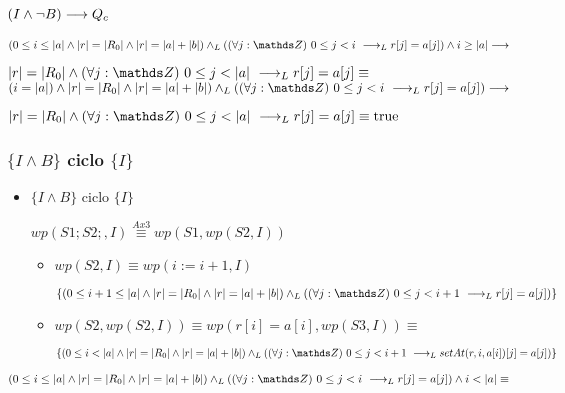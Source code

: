 \documentclass{article}
\begin{document}
\subsubsection*{$(I \wedge \neg B) \longrightarrow Q_{c}$}
$(0 \leq i \leq \longitud{a} \wedge \longitud{r} = \longitud{R_{0}} \wedge \longitud{r} = \longitud{a} + \longitud{b}) \yLuego (\paraTodo{j}{0}{i} \implicaLuego r[j]=a[j]) \wedge i \geq \longitud{a} \implica$

$\longitud{r} = \longitud{R_{0}} \wedge \paraTodo{j}{0}{\longitud{a}} \implicaLuego r[j]=a[j] \equiv$ \\

$(i = \longitud{a}) \wedge \longitud{r} = \longitud{R_{0}} \wedge \longitud{r} = \longitud{a} + \longitud{b}) \yLuego (\paraTodo{j}{0}{i} \implicaLuego r[j]=a[j]) \implica$

$\longitud{r} = \longitud{R_{0}} \wedge \paraTodo{j}{0}{\longitud{a}} \implicaLuego r[j]=a[j] \equiv \True$

\subsubsection*{$\{I \wedge B\}$ ciclo $\{ I \}$}

\begin{itemize}
    \item $\{I \wedge B\}$ ciclo $\{ I \}$
    
    $wp(S1;S2;, I) \stackrel{Ax3}{\equiv} wp(S1,wp(S2,I))$

    \begin{itemize}
        \item $wp(S2, I) \equiv wp(i:= i+1, I)$

        $ \{ (0 \leq i+1 \leq \longitud{a} \wedge \longitud{r} = \longitud{R_{0}} \wedge \longitud{r} = \longitud{a} + \longitud{b}) \yLuego (\paraTodo{j}{0}{i+1} \implicaLuego r[j]=a[j]) \} $

        \item $wp(S2,wp(S2, I))\equiv wp(r[i] = a[i],wp(S3, I)) \equiv$

        $ \{ (0 \leq i < \longitud{a} \wedge \longitud{r} = \longitud{R_{0}} \wedge \longitud{r} = \longitud{a} + \longitud{b}) \yLuego (\paraTodo{j}{0}{i+1} \implicaLuego setAt(r,i,a[i])[j]=a[j]) \}$
    \end{itemize}

\end{itemize}

$ (0 \leq i \leq \longitud{a} \wedge \longitud{r} = \longitud{R_{0}} \wedge \longitud{r} = \longitud{a} + \longitud{b}) \yLuego (\paraTodo{j}{0}{i} \implicaLuego r[j]=a[j]) \wedge i < \longitud{a} \equiv $ \\
\end{document}
